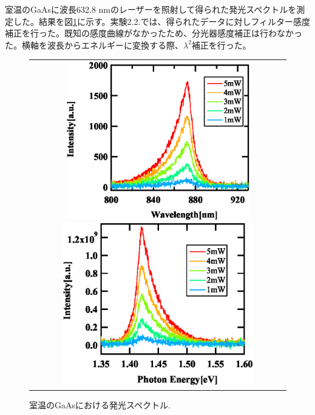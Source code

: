 \documentclass[11pt,a4j]{jsarticle}
\begin{document}
室温のGaAsに波長632.8 nmのレーザーを照射して得られた発光スペクトルを測定した。結果を図\ref{fig_gaas_rt_spec1}に示す。実験2.2.では、得られたデータに対しフィルター感度補正を行った。既知の感度曲線がなかったため、分光器感度補正は行わなかった。横軸を波長からエネルギーに変換する際、$\lambda^2$補正を行った。

\begin{figure}[ht]
 \centering
 \begin{tabular}{c}

  \begin{minipage}{0.5\hsize}

   \includegraphics[clip,width=8cm]{start2_GaAs_rt_Spectrum_wav.eps}
  \end{minipage}

    \begin{minipage}{0.06\hsize}%
      \hspace{1mm}
    \end{minipage}

  \begin{minipage}{0.5\hsize}
   \centering
   \includegraphics[clip,width=8.3cm]{start2_GaAs_rt_Spectrum_eV.eps}
  \end{minipage}
 \end{tabular}
 \caption{室温のGaAsにおける発光スペクトル.}
 \label{fig_gaas_rt_spec1}

\end{figure}
\end{document}

